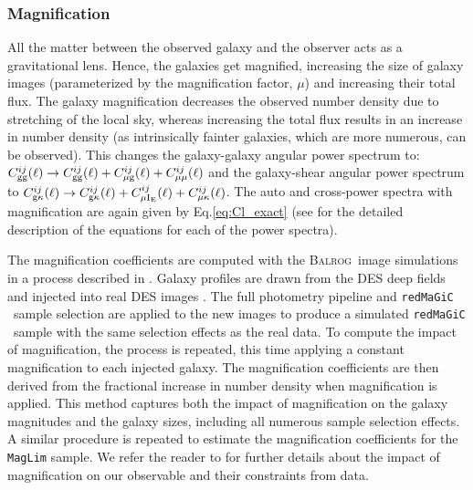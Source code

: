 \documentclass[aps, prd,twocolumn,superscriptaddress,nofootinbib,preprintnumbers]{revtex4-1}
\newcommand{\redmagic}{\texttt{redMaGiC} }
\newcommand{\maglim}{\texttt{MagLim} }
\newcommand{\balrog}{{\textsc{Balrog}}}
\begin{document}
\subsubsection{Magnification}
All the matter between the observed galaxy and the observer acts as a gravitational lens. Hence, the galaxies get magnified, increasing the size of galaxy images (parameterized by the magnification factor, $\mu$) and increasing their total flux. The galaxy magnification decreases the observed number density due to stretching of the local sky, whereas increasing the total flux results in an increase in number density (as intrinsically fainter galaxies, which are more numerous, can be observed). This changes the galaxy-galaxy angular power spectrum to: $C^{ij}_{\rm gg}(\ell) \to C^{ij}_{\rm gg}(\ell) + C^{ij}_{\rm \mu g}(\ell) + C^{ij}_{\rm \mu \mu}(\ell) $ and the galaxy-shear angular power spectrum to $C^{ij}_{\rm g\kappa}(\ell) \to C^{ij}_{\rm g\kappa}(\ell) + C^{ij}_{\rm \mu I_{\rm E}}(\ell) + C^{ij}_{\rm \mu \kappa}(\ell)$. The auto and cross-power spectra with magnification are again given by Eq.\ref{eq:Cl_exact} (see \cite{y3-generalmethods} for the detailed description of the equations for each of the power spectra). 

The magnification coefficients are computed with the \balrog\ image simulations \citep{Suchyta_2016,y3-balrog} in a process described in \cite{y3-2x2ptmagnification}. Galaxy profiles are drawn from the DES deep fields \citep{y3-deepfields} and injected into real DES images \citep{Morganson_2018}. The full photometry pipeline \citep{y3-gold} and \redmagic\ sample selection are applied to the new images to produce a simulated \redmagic\ sample with the same selection effects as the real data. To compute the impact of magnification, the process is repeated, this time applying a constant magnification to each injected galaxy. The magnification coefficients are then derived from the fractional increase in number density when magnification is applied. This method captures both the impact of magnification on the galaxy magnitudes and the galaxy sizes, including all numerous sample selection effects. A similar procedure is repeated to estimate the magnification coefficients for the \maglim sample. We refer the reader to \citet*{y3-2x2ptmagnification} for further details about the impact of magnification on our observable and their constraints from data. 
\end{document}
